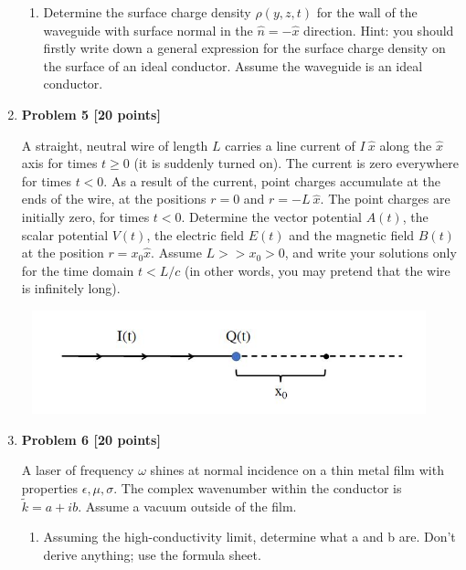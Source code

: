 \documentclass[fleqn]{article}
\begin{document}
\begin{enumerate}
\begin{enumerate}
      \item Determine the surface charge density $\rho(y,z,t)$ for the wall of the waveguide with surface normal
      in the $\hat{n}=-\hat{x}$ direction. Hint: you should firstly write down a general expression for the
      surface charge density on the surface of an ideal conductor. Assume the waveguide is an ideal
      conductor.

  
    \end{enumerate}

  \item \textbf{Problem 5 [20 points]}
  
  A straight, neutral wire of length $L$ carries a line current of $I ~ \hat{x}$ along the $\hat{x}$ axis for times
  $t \ge 0$  (it is suddenly turned on). The current is zero everywhere for times $t < 0$. As a result of the current,
  point charges accumulate at the ends of the wire, at the positions $r=0$ and $r=-L ~ \hat{x}$. The point charges
  are initially zero, for times $t < 0$. Determine the vector potential $A(t)$, the scalar potential $V(t)$, the
  electric field $E(t)$ and the magnetic field $B(t)$ at the position $r=x_0 \hat{x}$. Assume $L >> x_0 > 0$, and 
  write your solutions only for the time domain $t < L/c$ (in other words, you may pretend that the
  wire is infinitely long).
  \begin{center}
    \includegraphics[height=3cm, width=12cm]{2.JPG}
  \end{center}



  \item \textbf{Problem 6 [20 points]}

  A laser of frequency $\omega$ shines at normal incidence on a thin metal film with properties $\epsilon, \mu, \sigma$. 
  The complex wavenumber within the conductor is $\tilde{k}= a + ib$. Assume a vacuum outside of the film.
    \begin{enumerate}
      \item Assuming the high-conductivity limit, determine what a and b are. Don't derive anything; use
      the formula sheet.


\end{enumerate}
\end{enumerate}
\end{document}
